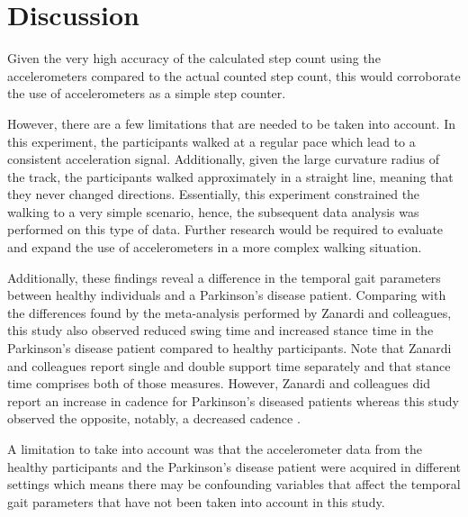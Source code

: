 
\section{Discussion}
Given the very high accuracy of the calculated step count using the accelerometers compared to the actual counted step count, this would corroborate the use of accelerometers as a simple step counter. 

However, there are a few limitations that are needed to be taken into account. In this experiment, the participants walked at a regular pace which lead to a consistent acceleration signal. Additionally, given the large curvature radius of the track, the participants walked approximately in a straight line, meaning that they never changed directions. Essentially, this experiment constrained the walking to a very simple scenario, hence, the subsequent data analysis was performed on this type of data. Further research would be required to evaluate and expand the use of accelerometers in a more complex walking situation. 

Additionally, these findings reveal a difference in the temporal gait parameters between healthy individuals and a Parkinson's disease patient. Comparing with the differences found by the meta-analysis performed by Zanardi and colleagues, this study also observed reduced swing time and increased stance time in the Parkinson's disease patient compared to healthy participants. Note that Zanardi and colleagues report single and double support time separately and that stance time comprises both of those measures. However, Zanardi and colleagues did report an increase in cadence for Parkinson's diseased patients whereas this study observed the opposite, notably, a decreased cadence \cite{zanardi_gait_2021}.

A limitation to take into account was that the accelerometer data from the healthy participants and the Parkinson's disease patient were acquired in different settings which means there may be confounding variables that affect the temporal gait parameters that have not been taken into account in this study. 


